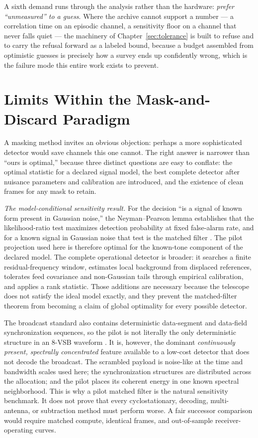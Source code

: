 A sixth demand runs through the analysis rather than the hardware: \emph{prefer ``unmeasured'' to a guess}. Where the archive cannot support a number --- a correlation time on an episodic channel, a sensitivity floor on a channel that never falls quiet --- the machinery of Chapter~\ref{sec:tolerance} is built to refuse and to carry the refusal forward as a labeled bound, because a budget assembled from optimistic guesses is precisely how a survey ends up confidently wrong, which is the failure mode this entire work exists to prevent.

\section{Limits Within the Mask-and-Discard Paradigm}
\label{sec:intro:optimal}

A masking method invites an obvious objection: perhaps a more sophisticated detector would save channels this one cannot. The right answer is narrower than ``ours is optimal,'' because three distinct questions are easy to conflate: the optimal statistic for a declared signal model, the best complete detector after nuisance parameters and calibration are introduced, and the existence of clean frames for any mask to retain.

\emph{The model-conditional sensitivity result.} For the decision ``is a signal of known form present in Gaussian noise,'' the Neyman--Pearson lemma \cite{neyman1933} establishes that the likelihood-ratio test maximizes detection probability at fixed false-alarm rate, and for a known signal in Gaussian noise that test is the matched filter \cite{north1943,kay1998}. The pilot projection used here is therefore optimal for the known-tone component of the declared model. The complete operational detector is broader: it searches a finite residual-frequency window, estimates local background from displaced references, tolerates feed covariance and non-Gaussian tails through empirical calibration, and applies a rank statistic. Those additions are necessary because the telescope does not satisfy the ideal model exactly, and they prevent the matched-filter theorem from becoming a claim of global optimality for every possible detector.

The broadcast standard also contains deterministic data-segment and data-field synchronization sequences, so the pilot is not literally the only deterministic structure in an 8-VSB waveform \cite{atsc-a53}. It is, however, the dominant \emph{continuously present, spectrally concentrated} feature available to a low-cost detector that does not decode the broadcast. The scrambled payload is noise-like at the time and bandwidth scales used here; the synchronization structures are distributed across the allocation; and the pilot places its coherent energy in one known spectral neighborhood. This is why a pilot matched filter is the natural sensitivity benchmark. It does not prove that every cyclostationary, decoding, multi-antenna, or subtraction method must perform worse. A fair successor comparison would require matched compute, identical frames, and out-of-sample receiver-operating curves.

